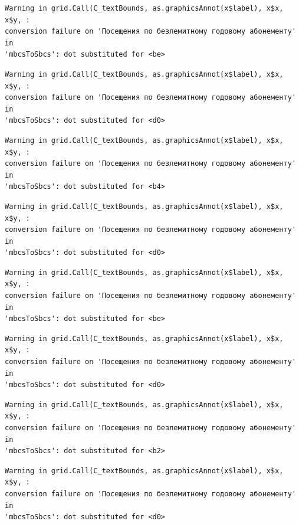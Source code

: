 \documentclass[
  letterpaper,
  DIV=11,
  numbers=noendperiod]{scrartcl}
\begin{document}
\begin{verbatim}
Warning in grid.Call(C_textBounds, as.graphicsAnnot(x$label), x$x, x$y, :
conversion failure on 'Посещения по безлемитному годовому абонементу' in
'mbcsToSbcs': dot substituted for <be>
\end{verbatim}

\begin{verbatim}
Warning in grid.Call(C_textBounds, as.graphicsAnnot(x$label), x$x, x$y, :
conversion failure on 'Посещения по безлемитному годовому абонементу' in
'mbcsToSbcs': dot substituted for <d0>
\end{verbatim}

\begin{verbatim}
Warning in grid.Call(C_textBounds, as.graphicsAnnot(x$label), x$x, x$y, :
conversion failure on 'Посещения по безлемитному годовому абонементу' in
'mbcsToSbcs': dot substituted for <b4>
\end{verbatim}

\begin{verbatim}
Warning in grid.Call(C_textBounds, as.graphicsAnnot(x$label), x$x, x$y, :
conversion failure on 'Посещения по безлемитному годовому абонементу' in
'mbcsToSbcs': dot substituted for <d0>
\end{verbatim}

\begin{verbatim}
Warning in grid.Call(C_textBounds, as.graphicsAnnot(x$label), x$x, x$y, :
conversion failure on 'Посещения по безлемитному годовому абонементу' in
'mbcsToSbcs': dot substituted for <be>
\end{verbatim}

\begin{verbatim}
Warning in grid.Call(C_textBounds, as.graphicsAnnot(x$label), x$x, x$y, :
conversion failure on 'Посещения по безлемитному годовому абонементу' in
'mbcsToSbcs': dot substituted for <d0>
\end{verbatim}

\begin{verbatim}
Warning in grid.Call(C_textBounds, as.graphicsAnnot(x$label), x$x, x$y, :
conversion failure on 'Посещения по безлемитному годовому абонементу' in
'mbcsToSbcs': dot substituted for <b2>
\end{verbatim}

\begin{verbatim}
Warning in grid.Call(C_textBounds, as.graphicsAnnot(x$label), x$x, x$y, :
conversion failure on 'Посещения по безлемитному годовому абонементу' in
'mbcsToSbcs': dot substituted for <d0>
\end{verbatim}
\end{document}
